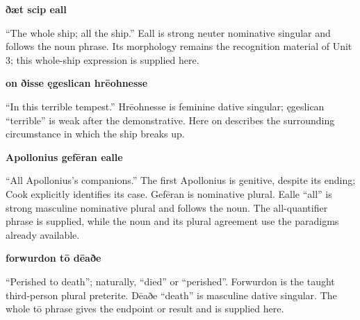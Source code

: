 \textbf{ðæt scip eall}

“The whole ship; all the ship.” Eall is strong neuter nominative singular and follows the noun phrase. Its morphology remains the recognition material of Unit 3; this whole-ship expression is supplied here.

\textbf{on ðisse ęgeslican hrēohnesse}

“In this terrible tempest.” Hrēohnesse is feminine dative singular; ęgeslican “terrible” is weak after the demonstrative. Here on describes the surrounding circumstance in which the ship breaks up.

\textbf{Apollonius gefēran ealle}

“All Apollonius’s companions.” The first Apollonius is genitive, despite its ending; Cook explicitly identifies its case. Gefēran is nominative plural. Ealle “all” is strong masculine nominative plural and follows the noun. The all-quantifier phrase is supplied, while the noun and its plural agreement use the paradigms already available.

\textbf{forwurdon tō dēaðe}

“Perished to death”; naturally, “died” or “perished”. Forwurdon is the taught third-person plural preterite. Dēaðe “death” is masculine dative singular. The whole tō phrase gives the endpoint or result and is supplied here.


